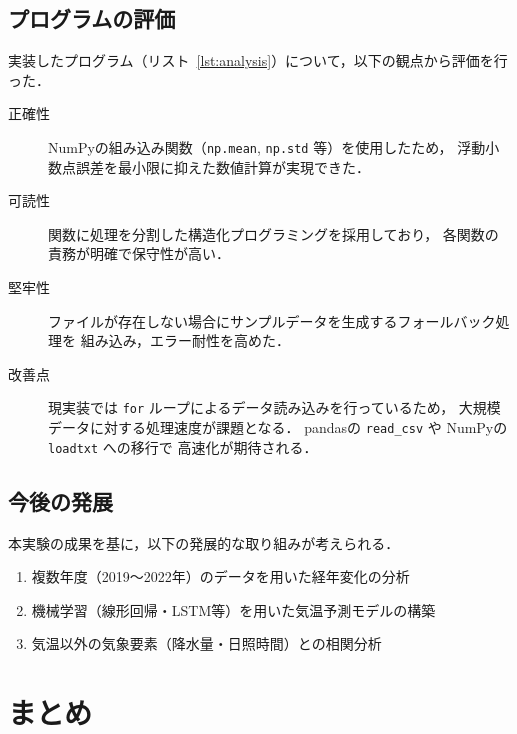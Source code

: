 \documentclass[12pt,a4paper]{ltjsarticle}
\begin{document}
\subsection{プログラムの評価}

実装したプログラム（リスト~\ref{lst:analysis}）について，以下の観点から評価を行った．

\begin{description}
  \item[正確性]
        NumPyの組み込み関数（\texttt{np.mean}, \texttt{np.std} 等）を使用したため，
        浮動小数点誤差を最小限に抑えた数値計算が実現できた．

  \item[可読性]
        関数に処理を分割した構造化プログラミングを採用しており，
        各関数の責務が明確で保守性が高い．

  \item[堅牢性]
        ファイルが存在しない場合にサンプルデータを生成するフォールバック処理を
        組み込み，エラー耐性を高めた．

  \item[改善点]
        現実装では \texttt{for} ループによるデータ読み込みを行っているため，
        大規模データに対する処理速度が課題となる．
        pandasの \texttt{read\_csv} や NumPyの \texttt{loadtxt} への移行で
        高速化が期待される．
\end{description}

\subsection{今後の発展}

本実験の成果を基に，以下の発展的な取り組みが考えられる．

\begin{enumerate}[label=\arabic*.]
  \item 複数年度（2019〜2022年）のデータを用いた経年変化の分析
  \item 機械学習（線形回帰・LSTM等）を用いた気温予測モデルの構築
  \item 気温以外の気象要素（降水量・日照時間）との相関分析
\end{enumerate}

\section{まとめ}\label{sec:summary}
\end{document}
